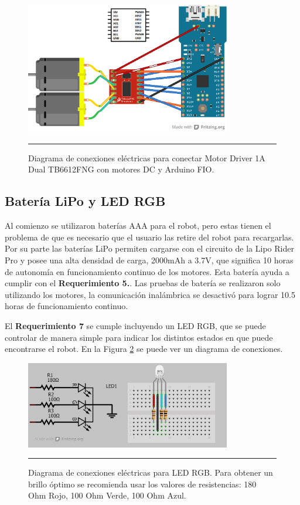 \begin{figure}[htbp]
	\centering
		\includegraphics[width=0.8\textwidth]{./Figures/MODI/MODI_without_LED_bb.png}
		\rule{35em}{0.5pt}
	\caption[Conexión eléctrica Motor Driver 1A Dual TB6612FNG]{Diagrama de conexiones eléctricas para conectar Motor Driver 1A Dual TB6612FNG con motores DC y Arduino FIO.}
	\label{fig:TB6612FNG}
\end{figure}


\subsection{Batería LiPo y LED RGB}

Al comienzo se utilizaron baterías AAA para el robot, pero estas tienen el problema de que es necesario que el usuario las retire del robot para recargarlas. Por su parte las baterías LiPo permiten cargarse con el circuito de la Lipo Rider Pro y posee una alta densidad de carga, 2000mAh a 3.7V, que significa 10 horas de autonomía en funcionamiento continuo de los motores. Esta batería ayuda a cumplir con el \textbf{Requerimiento 5.}. Las pruebas de batería se realizaron solo utilizando los motores, la comunicación inalámbrica se desactivó para lograr 10.5 horas de funcionamiento continuo.

El \textbf{Requerimiento 7} se cumple incluyendo un LED RGB, que se puede controlar de manera simple para indicar los distintos estados en que puede encontrarse el robot. En la Figura \ref{fig:LED} se puede ver un diagrama de conexiones.

\begin{figure}[htbp]
	\centering
		\includegraphics[width=0.8\textwidth]{./Figures/MODI/RGBLED.png}
		\rule{35em}{0.5pt}
	\caption[Conexión eléctrica LED RGB]{Diagrama de conexiones eléctricas para LED RGB. Para obtener un brillo óptimo se recomienda usar los valores de resistencias: 180 Ohm Rojo, 100 Ohm Verde, 100 Ohm Azul.}
	\label{fig:LED}
\end{figure}

